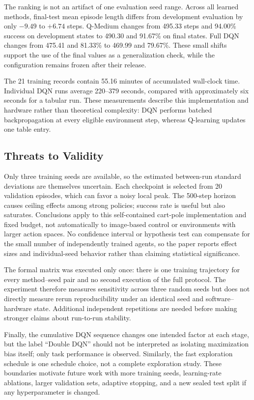 \documentclass[conference]{IEEEtran}
\begin{document}
The ranking is not an artifact of one evaluation seed range. Across all
learned methods, final-test mean episode length differs from development
evaluation by only $-9.49$ to $+6.74$ steps. Q-Medium changes from
495.33 steps and 94.00\% success on development states to 490.30 and 91.67\%
on final states. Full DQN changes from 475.41 and 81.33\% to 469.99 and
79.67\%. These small shifts support the use of the final values as a
generalization check, while the configuration remains frozen after their
release.

The 21 training records contain 55.16 minutes of accumulated wall-clock time.
Individual DQN runs average 220--379 seconds, compared with approximately six
seconds for a tabular run. These measurements describe this implementation
and hardware rather than theoretical complexity: DQN performs batched
backpropagation at every eligible environment step, whereas Q-learning
updates one table entry.

\subsection{Threats to Validity}

Only three training seeds are available, so the estimated between-run
standard deviations are themselves uncertain. Each checkpoint is selected
from 20 validation episodes, which can favor a noisy local peak. The
500-step horizon causes ceiling effects among strong policies; success rate
is useful but also saturates. Conclusions apply to this self-contained
cart-pole implementation and fixed budget, not automatically to image-based
control or environments with larger action spaces. No confidence interval or
hypothesis test can compensate for the small number of independently trained
agents, so the paper reports effect sizes and individual-seed behavior rather
than claiming statistical significance.

The formal matrix was executed only once: there is one training trajectory
for every method--seed pair and no second execution of the full protocol.
The experiment therefore measures sensitivity across three random seeds but
does not directly measure rerun reproducibility under an identical seed and
software--hardware state. Additional independent repetitions are needed
before making stronger claims about run-to-run stability.

Finally, the cumulative DQN sequence changes one intended factor at each
stage, but the label ``Double DQN'' should not be interpreted as isolating
maximization bias itself; only task performance is observed. Similarly, the
fast exploration schedule is one schedule choice, not a complete exploration
study. These boundaries motivate future work with more training seeds,
learning-rate ablations, larger validation sets, adaptive stopping, and a new
sealed test split if any hyperparameter is changed.
\end{document}
